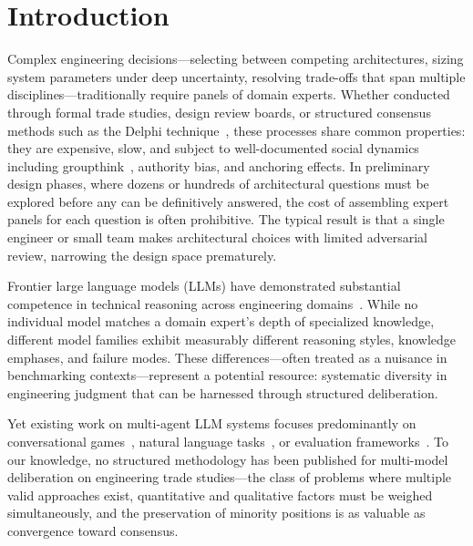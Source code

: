 \documentclass[11pt,a4paper]{article}
\begin{document}
\onehalfspacing

\section{Introduction}
\label{sec:introduction}

Complex engineering decisions---selecting between competing architectures, sizing system parameters under deep uncertainty, resolving trade-offs that span multiple disciplines---traditionally require panels of domain experts. Whether conducted through formal trade studies, design review boards, or structured consensus methods such as the Delphi technique~\cite{linstone1975delphi}, these processes share common properties: they are expensive, slow, and subject to well-documented social dynamics including groupthink~\cite{janis1982groupthink}, authority bias, and anchoring effects. In preliminary design phases, where dozens or hundreds of architectural questions must be explored before any can be definitively answered, the cost of assembling expert panels for each question is often prohibitive. The typical result is that a single engineer or small team makes architectural choices with limited adversarial review, narrowing the design space prematurely.

Frontier large language models (LLMs) have demonstrated substantial competence in technical reasoning across engineering domains~\cite{bubeck2023sparks,openai2024gpt4}. While no individual model matches a domain expert's depth of specialized knowledge, different model families exhibit measurably different reasoning styles, knowledge emphases, and failure modes. These differences---often treated as a nuisance in benchmarking contexts---represent a potential resource: systematic diversity in engineering judgment that can be harnessed through structured deliberation.

Yet existing work on multi-agent LLM systems focuses predominantly on conversational games~\cite{du2023debate}, natural language tasks~\cite{wu2023autogen}, or evaluation frameworks~\cite{zheng2024judging}. To our knowledge, no structured methodology has been published for multi-model deliberation on engineering trade studies---the class of problems where multiple valid approaches exist, quantitative and qualitative factors must be weighed simultaneously, and the preservation of minority positions is as valuable as convergence toward consensus.
\end{document}
